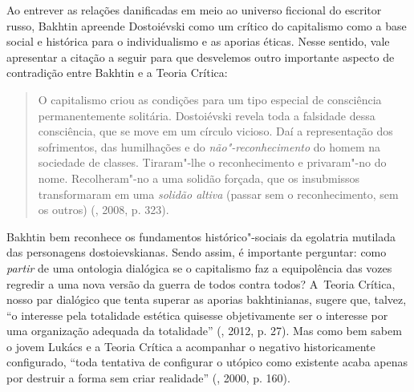 {Ao entrever as relações danificadas em meio ao universo ficcional do
escritor russo, Bakhtin apreende Dostoiévski como um crítico do
capitalismo como a base social e histórica para o individualismo e as
aporias éticas. Nesse sentido, vale apresentar a citação a seguir para
que desvelemos outro importante aspecto de contradição entre Bakhtin e a
Teoria Crítica:

\begin{quote}
O capitalismo criou as condições para um tipo especial de consciência
permanentemente solitária. Dostoiévski revela toda a falsidade dessa
consciência, que se move em um círculo vicioso. Daí a representação dos
sofrimentos, das humilhações e do \emph{não"-reconhecimento} do homem na
sociedade de classes. Tiraram"-lhe o reconhecimento e privaram"-no do
nome. Recolheram"-no a uma solidão forçada, que os insubmissos
transformaram em uma \emph{solidão altiva} (passar sem o reconhecimento,
sem os outros) (, 2008, p. 323).
\end{quote}

Bakhtin bem reconhece os fundamentos histórico"-sociais da egolatria
mutilada das personagens dostoievskianas. Sendo assim, é importante
perguntar: como \emph{partir} de uma ontologia dialógica se o
capitalismo faz a equipolência das vozes regredir a uma nova versão da
guerra de todos contra todos? A~Teoria Crítica, nosso par dialógico que
tenta superar as aporias bakhtinianas, sugere que, talvez, ``o interesse
pela totalidade estética quisesse objetivamente ser o interesse por uma
organização adequada da totalidade'' (, 2012, p. 27). Mas como bem
sabem o jovem Lukács e a Teoria Crítica a acompanhar o negativo
historicamente configurado, ``toda tentativa de configurar o utópico
como existente acaba apenas por destruir a forma sem criar realidade''
(, 2000, p. 160).

}
